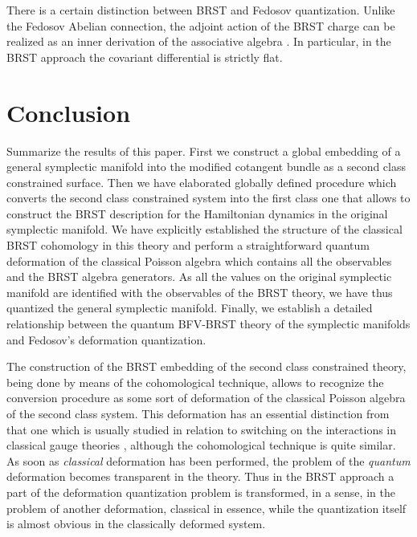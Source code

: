 \documentclass[a4paper,11pt,oneside]{amsart}
\theoremstyle{plain}
\numberwithin{equation}{section} %
\numberwithin{figure}{section} %
\def\mod{{\mathcal T}^*_\rho}
\def\manM{{\mathcal M}}
\def\aA{{ \mathfrak A}}
\begin{document}
\noindent
There is a certain distinction between BRST and Fedosov
quantization.  Unlike the Fedosov Abelian connection,
the adjoint action of the BRST charge can be realized
as an inner derivation of the associative algebra
\myHighlight{$\aA^q$}\coordHE{}.  In particular, in the BRST approach the
covariant differential \coordHE{} is strictly flat.

\section{Conclusion}

\noindent
Summarize the results of this paper.  First we construct a global
embedding of a general symplectic manifold \myHighlight{$\manM$}\coordHE{}
into the modified cotangent bundle \myHighlight{$\mod\manM$}\coordHE{} as a second class
constrained surface.  Then we have elaborated globally defined procedure
which converts the second class constrained system into the first
class one that allows to construct the BRST description
for the Hamiltonian dynamics in the original
symplectic manifold.  We have explicitly established
the structure of the classical BRST
cohomology in this theory and perform a straightforward quantum
deformation of the classical Poisson algebra which contains all the
observables and the BRST algebra generators.  As all the values
on the original symplectic manifold are identified with the
observables of the BRST theory, we have thus quantized the
general symplectic manifold.  Finally, we establish a detailed
relationship between the quantum BFV-BRST theory of the symplectic
manifolds and Fedosov's deformation quantization.


\noindent
The construction of the BRST embedding of the second
class constrained theory, being done by means of the
cohomological technique, allows to recognize the
conversion procedure as some sort of deformation of the classical
Poisson algebra of the second class system. This deformation has an essential
distinction from that one which is usually studied in relation to switching
on the interactions in classical gauge theories \cite{henneaux-deform},
although the cohomological technique is quite similar. As
soon as {\it classical} deformation has been performed, the problem of the
{\it quantum} deformation becomes transparent in the theory.  Thus in the
BRST approach a part of the deformation quantization problem is transformed,
in a sense, in the problem of another deformation, classical in essence,
while the quantization itself is almost obvious in the classically deformed
system.
\end{document}
